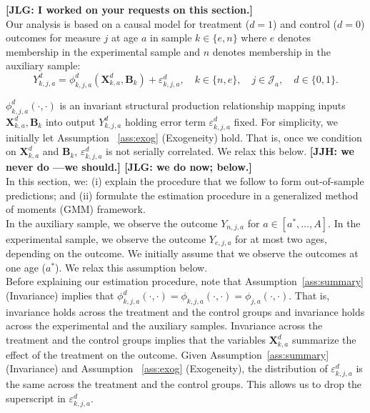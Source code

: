 \noindent \textbf{[JLG: I worked on your requests on this section.]}\\

\noindent Our analysis is based on a causal model for treatment ($d=1$) and control ($d=0$) outcomes for measure $j$ at age $a$ in sample $k \in \{e,n\}$ where $e$ denotes membership in the experimental sample and $n$ denotes membership in the auxiliary sample:\\

\begin{equation}\label{eq:outcome}
Y^d_{k,j,a} = \phi^d_{k,j,a} (\bm{X}^d_{k,a}, \bm{B}_k) + \varepsilon^d_{k,j,a}, \quad k \in \{n,e\}, \quad j \in \mathcal{J}_a, \quad d \in \{0, 1\}.
\end{equation}

\noindent $\phi^d_{k,j,a}\left( \cdot, \cdot \right)$ is an invariant structural production relationship mapping inputs $\bm{X}^d_{k,a}, \bm{B}_k$ into output $Y^d_{k,j,a}$ holding error term $\varepsilon^d_{k,j,a}$ fixed. For simplicity, we initially let Assumption ~\ref{ass:exog} (Exogeneity) hold. That is, once we condition on $\bm{X}^d_{k,a}$ and $\bm{B}_k$, $ \varepsilon^d_{k,j,a}$ is not serially correlated. We relax this below. \textbf{[JJH: we never do ---we should.] [JLG: we do now; below.]}\\

\noindent In this section, we: (i) explain the procedure that we follow to form out-of-sample predictions; and (ii) formulate the estimation procedure in a generalized method of moments (GMM) framework.\\

\noindent In the auxiliary sample, we observe the outcome $Y_{n,j,a}$ for $a \in [a^*, \ldots, A]$. In the experimental sample, we observe the outcome $Y_{e,j,a}$ for at most two ages, depending on the outcome. We initially assume that we observe the outcomes at one age ($a^*$). We relax this assumption below.\\

\noindent Before explaining our estimation procedure, note that Assumption~\ref{ass:summary} (Invariance) implies that $\phi_{k,j,a}^d \left (\cdot, \cdot \right) = \phi_{k,j,a}  \left (\cdot, \cdot \right) = \phi_{j,a}  \left (\cdot, \cdot \right)$. That is, invariance holds across the treatment and the control groups and invariance holds across the experimental and the auxiliary samples. Invariance across the treatment and the control groups implies that the variables $\bm{X}_{k,a}^d$ summarize the effect of the treatment on the outcome. Given Assumption~\ref{ass:summary} (Invariance)  and Assumption ~\ref{ass:exog} (Exogeneity), the distribution of $\varepsilon_{k,j,a}^d$ is the same across the treatment and the control groups. This allows us to drop the superscript in $\varepsilon_{k,j,a}^d$.\\

